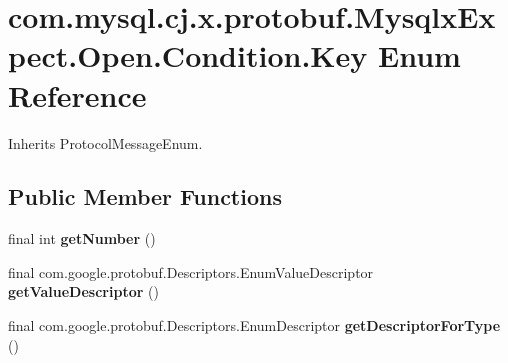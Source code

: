 \hypertarget{enumcom_1_1mysql_1_1cj_1_1x_1_1protobuf_1_1_mysqlx_expect_1_1_open_1_1_condition_1_1_key}{}\section{com.\+mysql.\+cj.\+x.\+protobuf.\+Mysqlx\+Expect.\+Open.\+Condition.\+Key Enum Reference}
\label{enumcom_1_1mysql_1_1cj_1_1x_1_1protobuf_1_1_mysqlx_expect_1_1_open_1_1_condition_1_1_key}


Inherits Protocol\+Message\+Enum.

\subsection*{Public Member Functions}
\begin{DoxyCompactItemize}
\item 
\mbox{\label{enumcom_1_1mysql_1_1cj_1_1x_1_1protobuf_1_1_mysqlx_expect_1_1_open_1_1_condition_1_1_key_a69f059d42ce43a0a9c43b3bc9f7bb14c}} 
final int {\bfseries get\+Number} ()
\item 
\mbox{\label{enumcom_1_1mysql_1_1cj_1_1x_1_1protobuf_1_1_mysqlx_expect_1_1_open_1_1_condition_1_1_key_a32e60913b503b7242ee3c60e68f2ac89}} 
final com.\+google.\+protobuf.\+Descriptors.\+Enum\+Value\+Descriptor {\bfseries get\+Value\+Descriptor} ()
\item 
\mbox{\label{enumcom_1_1mysql_1_1cj_1_1x_1_1protobuf_1_1_mysqlx_expect_1_1_open_1_1_condition_1_1_key_a5c1e4aa8b4579e6d6a744324bb330ca2}} 
final com.\+google.\+protobuf.\+Descriptors.\+Enum\+Descriptor {\bfseries get\+Descriptor\+For\+Type} ()
\end{DoxyCompactItemize}
